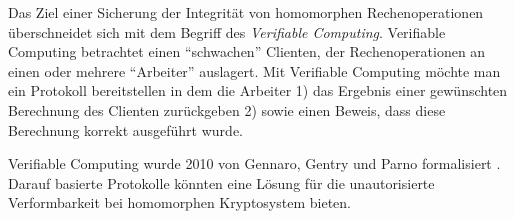 
Das Ziel einer Sicherung der Integrität von homomorphen Rechenoperationen überschneidet sich mit dem Begriff des \textit{Verifiable Computing}. Verifiable Computing betrachtet einen \enquote{schwachen} Clienten, der Rechenoperationen an einen oder mehrere \enquote{Arbeiter} auslagert. Mit Verifiable Computing möchte man ein Protokoll bereitstellen in dem die Arbeiter 1) das Ergebnis einer gewünschten Berechnung des Clienten zurückgeben 2) sowie einen Beweis, dass diese Berechnung korrekt ausgeführt wurde.

Verifiable Computing wurde 2010 von Gennaro, Gentry und Parno formalisiert \cite{gennaro2010non}. Darauf basierte Protokolle könnten eine Lösung für die unautorisierte Verformbarkeit bei homomorphen Kryptosystem bieten.

